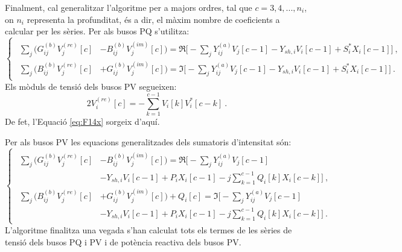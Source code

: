 Finalment, cal generalitzar l'algoritme per a majors ordres, tal que $c=3, 4, ... , n_i$, on $n_i$ representa la profunditat, és a dir, el màxim nombre de coeficients a calcular per les sèries. Per als busos PQ s'utilitza:
\begin{equation}
    \begin{cases}
    \begin{split}
    \sum_{j}(G^{(b)}_{ij}V^{(re)}_j[c]&-B^{(b)}_{ij}V^{(im)}_j[c]) = \Re\biggl[-\sum_{j}Y^{(a)}_{ij}V_j[c-1]-Y_{sh,i}V_i[c-1]+S^*_iX_i[c-1]\biggr]\ ,\\
    \sum_{j}(B^{(b)}_{ij}V^{(re)}_j[c]&+G^{(b)}_{ij}V^{(im)}_j[c]) = \Im\biggl[-\sum_{j}Y^{(a)}_{ij}V_j[c-1] -Y_{sh,i}V_i[c-1]+S^*_iX_i[c-1]\biggr]\ .
    \end{split}
\end{cases}
        \label{eq:F9PQ4}
\end{equation}
Els mòduls de tensió dels busos PV segueixen:
\begin{equation}
    2V^{(re)}_i[c]=-\sum_{k=1}^{c-1}V_i[k]V^*_i[c-k]\ .
        \label{eq:F14xx}
\end{equation}
De fet, l'Equació \ref{eq:F14x} sorgeix d'aquí.

Per als busos PV les equacions generalitzades dels sumatoris d'intensitat són:
\begin{equation}
    \begin{cases}
    \begin{split}
    \sum_{j}(G^{(b)}_{ij}V^{(re)}_j[c]&-B^{(b)}_{ij}V^{(im)}_j[c]) = \Re\biggl[-\sum_{j}Y^{(a)}_{ij}V_j[c-1]\\
    &-Y_{sh,i}V_i[c-1]+P_iX_i[c-1]-j\sum_{k=1}^{c-1}Q_i[k]X_i[c-k]\biggr]\ ,\\
    \sum_{j}(B^{(b)}_{ij}V^{(re)}_j[c]&+G^{(b)}_{ij}V^{(im)}_j[c])+Q_i[c] = \Im\biggl[-\sum_{j}Y^{(a)}_{ij}V_j[c-1]\\
    &-Y_{sh,i}V_i[c-1]+P_iX_i[c-1]-j\sum_{k=1}^{c-1}Q_i[k]X_i[c-k]\biggr]\ .
    \end{split}
\end{cases}
        \label{eq:F9PV4}
\end{equation}
L'algoritme finalitza una vegada s'han calculat tots els termes de les sèries de tensió dels busos PQ i PV i de potència reactiva dels busos PV. 

